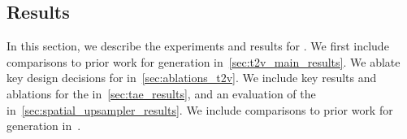 \subsection{Results}
In this section, we describe the experiments and results for \OursVideo.
We first include comparisons to prior work for \textToV generation in~\cref{sec:t2v_main_results}.
We ablate key design decisions for \OursVideo in~\cref{sec:ablations_t2v}.
We include key results and ablations for the \taeShort in~\cref{sec:tae_results}, and an evaluation of the \upsampler in~\cref{sec:spatial_upsampler_results}.
We include comparisons to prior work for \textToI generation in~.





